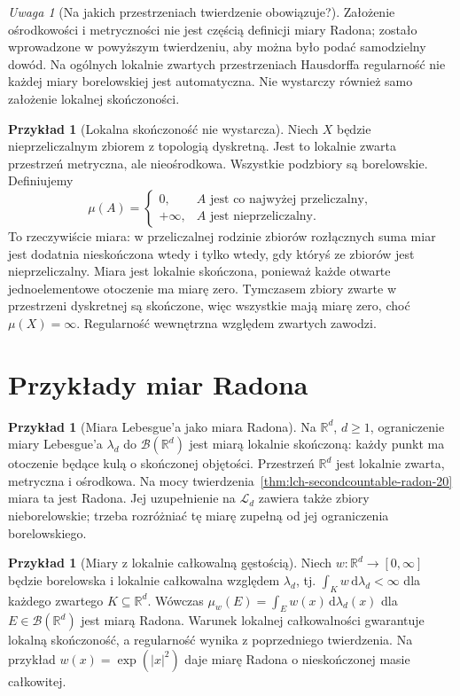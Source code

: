 \documentclass[11pt,a4paper,oneside]{book}
\numberwithin{equation}{chapter}
\theoremstyle{plain}
\theoremstyle{definition}
\newtheorem{przyklad}[twierdzenie]{Przykład}
\theoremstyle{remark}
\newtheorem{uwaga}[twierdzenie]{Uwaga}
\begin{document}
\begin{uwaga}[Na jakich przestrzeniach twierdzenie obowiązuje?]
Założenie ośrodkowości i metryczności nie jest częścią
definicji miary Radona; zostało wprowadzone w powyższym
twierdzeniu, aby można było podać samodzielny dowód.
Na ogólnych lokalnie zwartych przestrzeniach Hausdorffa
regularność nie każdej miary borelowskiej jest automatyczna.
Nie wystarczy również samo założenie lokalnej skończoności.
\end{uwaga}

\begin{przyklad}[Lokalna skończoność nie wystarcza]
\label{ex:nonradon-discrete-20}
Niech $X$ będzie nieprzeliczalnym zbiorem z topologią
dyskretną. Jest to lokalnie zwarta przestrzeń metryczna,
ale nieośrodkowa. Wszystkie podzbiory są borelowskie.
Definiujemy
\[
\mu(A)=\begin{cases}0,&A\text{ jest co najwyżej przeliczalny},\\
+\infty,&A\text{ jest nieprzeliczalny}.
\end{cases}
\]
To rzeczywiście miara: w przeliczalnej rodzinie zbiorów
rozłącznych suma miar jest dodatnia nieskończona wtedy
i tylko wtedy, gdy któryś ze zbiorów jest nieprzeliczalny.
Miara jest lokalnie skończona, ponieważ każde otwarte
jednoelementowe otoczenie ma miarę zero. Tymczasem
zbiory zwarte w przestrzeni dyskretnej są skończone,
więc wszystkie mają miarę zero, choć $\mu(X)=\infty$.
Regularność wewnętrzna względem zwartych zawodzi.
\end{przyklad}

\section{Przykłady miar Radona}
\begin{przyklad}[Miara Lebesgue'a jako miara Radona]
Na $\mathbb R^d$, $d\ge1$, ograniczenie miary Lebesgue'a
$\lambda_d$ do $\mathcal B(\mathbb R^d)$ jest miarą
lokalnie skończoną: każdy punkt ma otoczenie będące
kulą o skończonej objętości. Przestrzeń $\mathbb R^d$
jest lokalnie zwarta, metryczna i ośrodkowa.
Na mocy twierdzenia~\ref{thm:lch-secondcountable-radon-20}
miara ta jest Radona. Jej uzupełnienie na
$\mathcal L_d$ zawiera także zbiory nieborelowskie;
trzeba rozróżniać tę miarę zupełną od jej ograniczenia
borelowskiego.
\end{przyklad}

\begin{przyklad}[Miary z lokalnie całkowalną gęstością]
Niech $w:\mathbb R^d\to[0,\infty]$ będzie borelowska
i lokalnie całkowalna względem $\lambda_d$,
tj. $\int_Kw\,\mathrm d\lambda_d<\infty$ dla każdego
zwartego $K\subseteq\mathbb R^d$. Wówczas
$\mu_w(E)=\int_Ew(x)\,\mathrm d\lambda_d(x)$
dla $E\in\mathcal B(\mathbb R^d)$ jest miarą Radona.
Warunek lokalnej całkowalności gwarantuje lokalną
skończoność, a regularność wynika z poprzedniego
twierdzenia. Na przykład $w(x)=\exp(|x|^2)$ daje miarę
Radona o nieskończonej masie całkowitej.
\end{przyklad}
\end{document}
